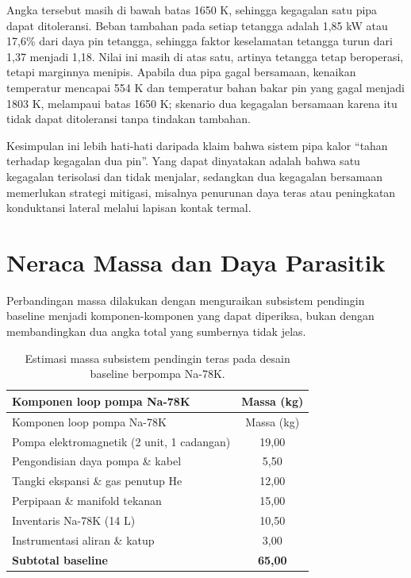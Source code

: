\documentclass[
  indonesian,
  12pt,
  a4paper,
]{report}
\begin{document}
Angka tersebut masih di bawah batas 1650 K, sehingga kegagalan satu pipa
dapat ditoleransi. Beban tambahan pada setiap tetangga adalah 1,85 kW
atau 17,6\% dari daya pin tetangga, sehingga faktor keselamatan tetangga
turun dari 1,37 menjadi 1,18. Nilai ini masih di atas satu, artinya
tetangga tetap beroperasi, tetapi marginnya menipis. Apabila dua pipa
gagal bersamaan, kenaikan temperatur mencapai 554 K dan temperatur bahan
bakar pin yang gagal menjadi 1803 K, melampaui batas 1650 K; skenario
dua kegagalan bersamaan karena itu tidak dapat ditoleransi tanpa
tindakan tambahan.

Kesimpulan ini lebih hati-hati daripada klaim bahwa sistem pipa kalor
``tahan terhadap kegagalan dua pin''. Yang dapat dinyatakan adalah bahwa
satu kegagalan terisolasi dan tidak menjalar, sedangkan dua kegagalan
bersamaan memerlukan strategi mitigasi, misalnya penurunan daya teras
atau peningkatan konduktansi lateral melalui lapisan kontak termal.

\section{Neraca Massa dan Daya
Parasitik}\label{neraca-massa-dan-daya-parasitik}

Perbandingan massa dilakukan dengan menguraikan subsistem pendingin
baseline menjadi komponen-komponen yang dapat diperiksa, bukan dengan
membandingkan dua angka total yang sumbernya tidak jelas.

\begin{longtable}[]{@{}lc@{}}
\caption{Estimasi massa subsistem pendingin teras pada desain baseline
berpompa Na-78K.}\label{tbl-massa-base}\tabularnewline
\toprule\noalign{}
Komponen loop pompa Na-78K & Massa (kg) \\
\midrule\noalign{}
\endfirsthead
\toprule\noalign{}
Komponen loop pompa Na-78K & Massa (kg) \\
\midrule\noalign{}
\endhead
\bottomrule\noalign{}
\endlastfoot
Pompa elektromagnetik (2 unit, 1 cadangan) & 19,00 \\
Pengondisian daya pompa \& kabel & 5,50 \\
Tangki ekspansi \& gas penutup He & 12,00 \\
Perpipaan \& manifold tekanan & 15,00 \\
Inventaris Na-78K (14 L) & 10,50 \\
Instrumentasi aliran \& katup & 3,00 \\
\textbf{Subtotal baseline} & \textbf{65,00} \\
\end{longtable}
\end{document}
